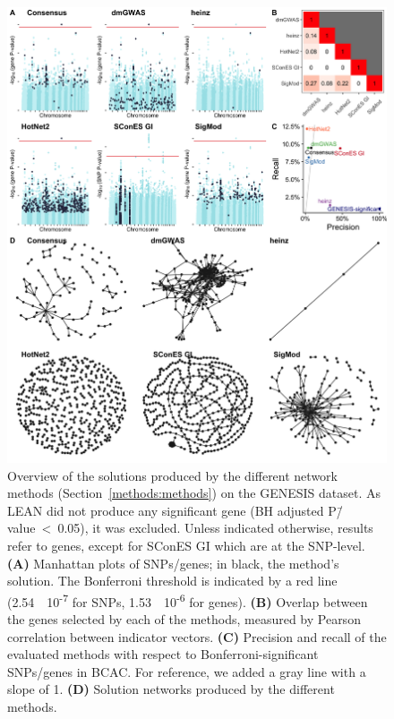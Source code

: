 \documentclass[10pt,letterpaper]{article}
\begin{document}
\begin{figure}[htbp]
  \centering
  \includegraphics[height=.75\textheight]{./figures/figure_1.png}
  \caption{Overview of the solutions produced by the different network methods (Section~\ref{methods:methods}) on the GENESIS dataset. As LEAN did not produce any significant gene (BH adjusted P\=/value~<~0.05), it was excluded. Unless indicated otherwise, results refer to genes, except for SConES GI which are at the SNP-level. \textbf{(A)} Manhattan plots of SNPs/genes; in black, the method's solution. The Bonferroni threshold is indicated by a red line (2.54~\texttimes{}~10\textsuperscript{-7} for SNPs, 1.53~\texttimes{}~10\textsuperscript{-6} for genes). \textbf{(B)} Overlap between the genes selected by each of the methods, measured by Pearson correlation between indicator vectors. \textbf{(C)} Precision and recall of the evaluated methods with respect to Bonferroni-significant SNPs/genes in BCAC. For reference, we added a gray line with a slope of 1. \textbf{(D)} Solution networks produced by the different methods.}
  \label{fig:solution_overview}
\end{figure}
\end{document}
